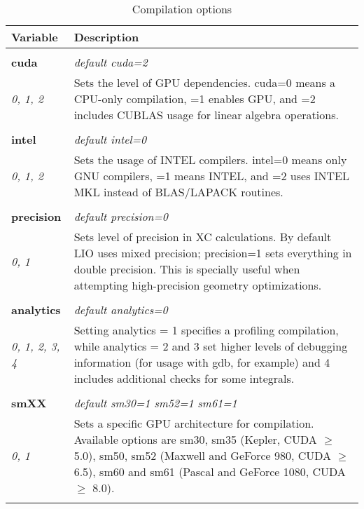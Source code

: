 \begin{Spacing}{1.0}
\begin{longtable}{ p{} p{} }

   \toprule
   \textbf{Variable} & Description \\*
   \midrule \\*
   \endhead

   \bottomrule
   \caption{Compilation options}
   \endfoot

   \textbf{cuda}
   &  \textit{default cuda=2}
   \\*\textit{0, 1, 2}
   & Sets the level of GPU dependencies. cuda=0 means a 
   CPU-only compilation, =1 enables GPU, and =2 includes
   CUBLAS usage for linear algebra operations. \\* \\

   \textbf{intel}
   &  \textit{default intel=0}
   \\*\textit{0, 1, 2}
   & Sets the usage of INTEL compilers. intel=0 means only
   GNU compilers, =1 means INTEL, and =2 uses INTEL MKL 
   instead of BLAS/LAPACK routines. \\* \\

   \textbf{precision}
   &  \textit{default precision=0}
   \\*\textit{0, 1}
   & Sets level of precision in XC calculations. By default
   LIO uses mixed precision; precision=1 sets everything in
   double precision. This is specially useful when attempting
   high-precision geometry optimizations.\\* \\

   \textbf{analytics}
   &  \textit{default analytics=0}
   \\*\textit{0, 1, 2, 3, 4}
   & Setting analytics = 1 specifies a profiling compilation,
   while analytics = 2 and 3 set higher levels of debugging
   information (for usage with gdb, for example) and 4 includes additional checks for some integrals.
   \\* \\

   \textbf{smXX}
   &  \textit{default sm30=1 sm52=1 sm61=1}
   \\*\textit{0, 1}
   & Sets a specific GPU architecture for compilation. 
   Available options are sm30, sm35 (Kepler, CUDA $\geq$ 
   5.0), sm50, sm52 (Maxwell and GeForce 980, CUDA $\geq$
   6.5), sm60 and sm61 (Pascal and GeForce 1080, CUDA $\geq$
   8.0).
   \\* \\

\end{longtable}
\end{Spacing}
